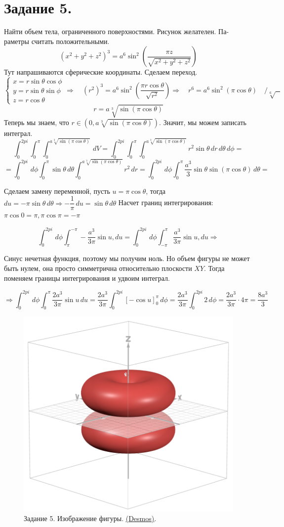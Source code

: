 \newpage
\section{Задание 5.}

Найти объем тела, ограниченного поверхностями. Рисунок желателен. Па-
раметры считать положительными.
$$\left(x^{2}+y^{2}+z^{2}\right)^{3}=a^{6}\sin^{2}\left(\frac{\pi z}{\sqrt{x^{2}+y^{2}+z^{2}}}\right)$$
Тут напрашиваются сферические координаты. Сделаем переход.
$$
\begin{cases}
    x=r\sin{\theta}\cos{\phi}\\
    y=r\sin{\theta}\sin{\phi}\\
    z=r\cos{\theta}
\end{cases} \Rightarrow \quad \left(r^2\right)^{3}=a^{6}\sin^{2}\left(\frac{\pi r\cos{\theta}}{\sqrt{r^2}}\right) \Rightarrow \quad r^6 = a^6\sin^2\left(\pi\cos{\theta}\right) \quad \big/ \sqrt[6]{\text{     }}$$
$$r = a\sqrt[3]{\sin\left(\pi\cos{\theta}\right)}$$
Теперь мы знаем, что $r\in\left(0, a\sqrt[3]{\sin\left(\pi\cos{\theta}\right)}\right)$. Значит, мы можем записать интеграл.
$$\int_0^{2pi}\int_0^{\pi}\int_0^{a\sqrt[3]{\sin\left(\pi\cos{\theta}\right)}} \,dV = \int_0^{2pi}\int_0^{\pi}\int_0^{a\sqrt[3]{\sin\left(\pi\cos{\theta}\right)}} r^2\sin{\theta}\,dr\,d\theta \, d\phi =$$ 
$$=\int_0^{2pi}\, d\phi \int_0^{\pi} \sin{\theta}\,d\theta \int_0^{a\sqrt[3]{\sin\left(\pi\cos{\theta}\right)}} r^2\,dr = \int_0^{2pi}\, d\phi \int_0^{\pi}\dfrac{a^3}{3} \sin{\theta}\sin\left(\pi\cos{\theta}\right)\,d\theta = $$
\begin{center}    
    Сделаем замену переменной, пусть $u = \pi\cos{\theta}$, тогда $du = -\pi\sin{\theta}\,d\theta \Rightarrow -\dfrac{1}{\pi}\,du = \sin{\theta}\,d\theta$ 
    Насчет границ интегрирования: $\pi\cos{0} = \pi, \pi\cos{\pi} = -\pi$
\end{center}
$$\int_0^{2pi}\, d\phi \int_{\pi}^{-\pi}-\dfrac{a^3}{3\pi} \sin{u},du = \int_0^{2pi}\, d\phi \int_{-\pi}^{\pi}\dfrac{a^3}{3\pi} \sin{u},du \Rightarrow$$
\begin{center}    
    Синус нечетная функция, поэтому мы получим ноль. Но объем фигуры не может быть нулем, она просто симметрична относительно плоскости $XY$. Тогда поменяем границы интегрирования и удвоим интеграл.
\end{center}
$$\Rightarrow \int_0^{2pi}\, d\phi \int_{0}^{\pi}\dfrac{2a^3}{3\pi} \sin{u}\,du  = \dfrac{2a^3}{3\pi}\int_0^{2pi} \left[-\cos{u}\right]_0^{\pi}\, d\phi = \dfrac{2a^3}{3\pi}\int_0^{2pi} 2\, d\phi = \dfrac{2a^3}{3\pi} \cdot 4\pi =\boxed{\dfrac{8a^3}{3}}$$

\begin{figure}[h!t]
    \centering
    \includegraphics[width=0.5\linewidth]{Task5/Figure_shape.png}
    \caption{Задание 5. Изображение фигуры. \underline{\href{https://www.desmos.com/3D/hq9g3zataj}{(Desmos)}}. }
\end{figure}